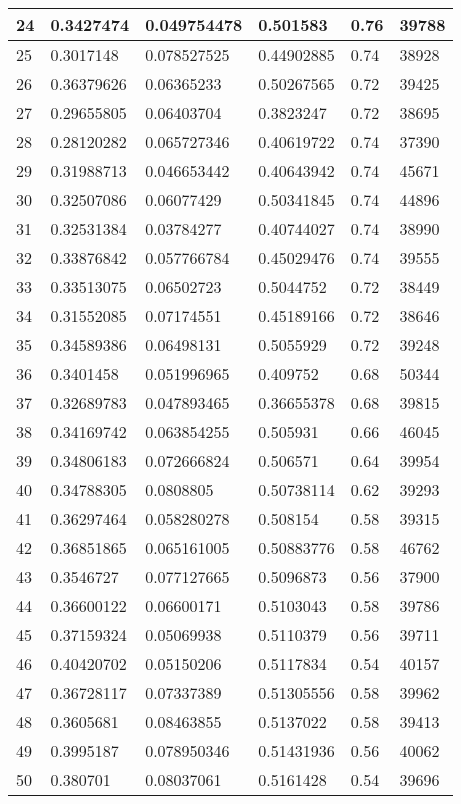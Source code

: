\begin{longtable}{|l|l|l|l|l|l|}
24 & 0.3427474 & 0.049754478 & 0.501583 & 0.76 & 39788 \\ \hline 
25 & 0.3017148 & 0.078527525 & 0.44902885 & 0.74 & 38928 \\ \hline 
26 & 0.36379626 & 0.06365233 & 0.50267565 & 0.72 & 39425 \\ \hline 
27 & 0.29655805 & 0.06403704 & 0.3823247 & 0.72 & 38695 \\ \hline 
28 & 0.28120282 & 0.065727346 & 0.40619722 & 0.74 & 37390 \\ \hline 
29 & 0.31988713 & 0.046653442 & 0.40643942 & 0.74 & 45671 \\ \hline 
30 & 0.32507086 & 0.06077429 & 0.50341845 & 0.74 & 44896 \\ \hline 
31 & 0.32531384 & 0.03784277 & 0.40744027 & 0.74 & 38990 \\ \hline 
32 & 0.33876842 & 0.057766784 & 0.45029476 & 0.74 & 39555 \\ \hline 
33 & 0.33513075 & 0.06502723 & 0.5044752 & 0.72 & 38449 \\ \hline 
34 & 0.31552085 & 0.07174551 & 0.45189166 & 0.72 & 38646 \\ \hline 
35 & 0.34589386 & 0.06498131 & 0.5055929 & 0.72 & 39248 \\ \hline 
36 & 0.3401458 & 0.051996965 & 0.409752 & 0.68 & 50344 \\ \hline 
37 & 0.32689783 & 0.047893465 & 0.36655378 & 0.68 & 39815 \\ \hline 
38 & 0.34169742 & 0.063854255 & 0.505931 & 0.66 & 46045 \\ \hline 
39 & 0.34806183 & 0.072666824 & 0.506571 & 0.64 & 39954 \\ \hline 
40 & 0.34788305 & 0.0808805 & 0.50738114 & 0.62 & 39293 \\ \hline 
41 & 0.36297464 & 0.058280278 & 0.508154 & 0.58 & 39315 \\ \hline 
42 & 0.36851865 & 0.065161005 & 0.50883776 & 0.58 & 46762 \\ \hline 
43 & 0.3546727 & 0.077127665 & 0.5096873 & 0.56 & 37900 \\ \hline 
44 & 0.36600122 & 0.06600171 & 0.5103043 & 0.58 & 39786 \\ \hline 
45 & 0.37159324 & 0.05069938 & 0.5110379 & 0.56 & 39711 \\ \hline 
46 & 0.40420702 & 0.05150206 & 0.5117834 & 0.54 & 40157 \\ \hline 
47 & 0.36728117 & 0.07337389 & 0.51305556 & 0.58 & 39962 \\ \hline 
48 & 0.3605681 & 0.08463855 & 0.5137022 & 0.58 & 39413 \\ \hline 
49 & 0.3995187 & 0.078950346 & 0.51431936 & 0.56 & 40062 \\ \hline 
50 & 0.380701 & 0.08037061 & 0.5161428 & 0.54 & 39696 \\ \hline 
\end{longtable}